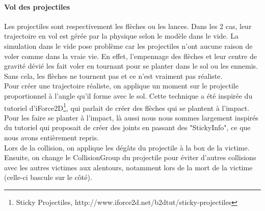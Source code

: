 \documentclass[a4paper,10pt]{article}
\begin{document}
    \paragraph{Vol des projectiles}
  Les projectiles sont respectivement les flèches ou les lances. Dans les 2 cas, leur trajectoire en vol est gérée par la physique selon le modèle dans le vide. La simulation dans le vide pose problème car les projectiles n'ont aucune raison de voler comme dans la vraie vie. En effet, l'empennage des flèches et leur centre de gravité dévié les fait voler en tournant pour se planter dans le sol ou les ennemis. Sans cela, les flèches ne tournent pas et ce n'est vraiment pas réaliste.\\
  Pour créer une trajectoire réaliste, on applique un moment sur le projectile proportionnel à l'angle qu'il forme avec le sol. Cette technique a été inspirée du tutoriel d'iForce2D\footnote{Sticky Projectiles, http://www.iforce2d.net/b2dtut/sticky-projectiles}, qui parlait de créer des flèches qui se plantent à l'impact. \\
  Pour les faire se planter à l'impact, là aussi nous nous sommes largement inspirés du tutoriel qui proposait de créer des joints en passant des "StickyInfo", ce que nous avons entièrement repris. \\ 
  Lors de la collision, on applique les dégâts du projectile à la box de la victime. Ensuite, on change le CollisionGroup du projectile pour éviter d'autres collisions avec les autres victimes aux alentours, notamment lors de la mort de la victime (celle-ci bascule sur le côté).
 \pagebreak 
\end{document}
